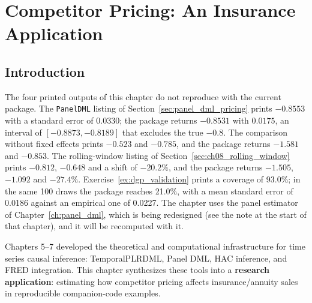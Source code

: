 
\chapter{Competitor Pricing: An Insurance Application}
\label{ch:competitor_pricing}

\section{Introduction}\label{sec:ch08_introduction}

\begin{warnbox}
The four printed outputs of this chapter do not reproduce with the current package. The
\texttt{PanelDML} listing of Section~\ref{sec:panel_dml_pricing} prints $-0.8553$ with a standard
error of $0.0330$; the package returns $-0.8531$ with $0.0175$, an interval of
$[-0.8873, -0.8189]$ that excludes the true $-0.8$. The comparison without fixed effects prints
$-0.523$ and $-0.785$, and the package returns $-1.581$ and $-0.853$. The rolling-window listing
of Section~\ref{sec:ch08_rolling_window} prints $-0.812$, $-0.648$ and a shift of $-20.2\%$, and the
package returns $-1.505$, $-1.092$ and $-27.4\%$. Exercise~\ref{ex:dgp_validation} prints a
coverage of 93.0\%; in the same 100 draws the package reaches 21.0\%, with a mean standard error of
0.0186 against an empirical one of 0.0227. The chapter uses the panel estimator of
Chapter~\ref{ch:panel_dml}, which is being redesigned (see the note at the start of that
chapter), and it will be recomputed with it.
\end{warnbox}

Chapters 5--7 developed the theoretical and computational infrastructure for time series causal inference: TemporalPLRDML, Panel DML, HAC inference, and FRED integration. This chapter synthesizes these tools into a \textbf{research application}: estimating how competitor pricing affects insurance/annuity sales in reproducible companion-code examples.


